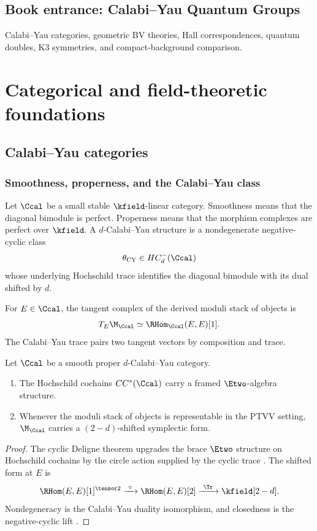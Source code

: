 \cleardoublepage
{}
{}
\chapter*{Book entrance: Calabi--Yau Quantum Groups}
\begin{summarybox}
Calabi--Yau categories, geometric BV theories, Hall correspondences, quantum doubles, K3 symmetries, and compact-background comparison.
\end{summarybox}
\part{Categorical and field-theoretic foundations}

\chapter{Calabi--Yau categories}
\section{Smoothness, properness, and the Calabi--Yau class}
Let $\Ccal$ be a small stable $\kfield$-linear category. Smoothness means that the diagonal bimodule is perfect. Properness means that the morphism complexes are perfect over $\kfield$. A $d$-Calabi--Yau structure is a nondegenerate negative-cyclic class
\[
 \theta_{\CY}\in HC^-_d(\Ccal)
\]
whose underlying Hochschild trace identifies the diagonal bimodule with its dual shifted by $d$.

For $E\in\Ccal$, the tangent complex of the derived moduli stack of objects is
\[
 T_E\M_{\Ccal}\simeq\RHom_{\Ccal}(E,E)[1].
\]
The Calabi--Yau trace pairs two tangent vectors by composition and trace.

\begin{theorem}
Let $\Ccal$ be a smooth proper $d$-Calabi--Yau category.
\begin{enumerate}
\item The Hochschild cochains $CC^*(\Ccal)$ carry a framed $\Etwo$-algebra structure.
\item Whenever the moduli stack of objects is representable in the PTVV setting, $\M_{\Ccal}$ carries a $(2-d)$-shifted symplectic form.
\end{enumerate}
\end{theorem}
\begin{proof}
The cyclic Deligne theorem upgrades the brace $\Etwo$ structure on Hochschild cochains by the circle action supplied by the cyclic trace \cite{BravRozenblyum}. The shifted form at $E$ is
\[
 \RHom(E,E)[1]^{\tensor2}
 \xrightarrow{\ \circ\ }
 \RHom(E,E)[2]
 \xrightarrow{\ \Tr\ }
 \kfield[2-d].
\]
Nondegeneracy is the Calabi--Yau duality isomorphism, and closedness is the negative-cyclic lift \cite{PTVV,BravDyckerhoff}.
\end{proof}

